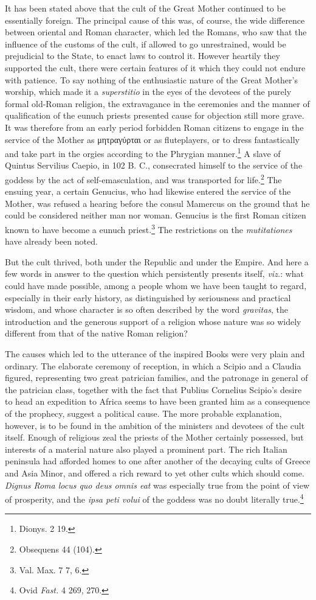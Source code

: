 \documentclass[a4paper, 11pt, oneside, polutonikogreek, english]{article}
\begin{document}
It has been stated above that the cult of the Great Mother continued to be essentially foreign. The principal cause of this was, of course, the wide difference between oriental and Roman character, which led the Romans, who saw that the influence of the customs of the cult, if allowed to go unrestrained, would be prejudicial to the State, to enact laws to control it. However heartily they supported the cult, there were certain features of it which they could not endure with patience. To say nothing of the enthusiastic nature of the Great Mother's worship, which made it a \emph{superstitio} in the eyes of the devotees of the purely formal old-Roman religion, the extravagance in the ceremonies and the manner of qualification of the eunuch priests presented cause for objection still more grave. It was therefore from an early period forbidden Roman citizens to engage in the service of the Mother as μητραγύρται or as fluteplayers, or to dress fantastically and take part in the orgies according to the Phrygian manner.\footnote{Dionys. 2 19.} A slave of Quintus Servilius Caepio, in 102 B. C., consecrated himself to the service of the goddess by the act of self-emasculation, and was transported for life.\footnote{Obsequens 44 (104).} The ensuing year, a certain Genucius, who had likewise entered the service of the Mother, was refused a hearing before the consul Mamercus on the ground that he could be considered neither man nor woman. Genucius is the first Roman citizen known to have become a eunuch priest.\footnote{Val. Max. 7 7, 6.} The restrictions on the \emph{mutitationes} have already been noted.

But the cult thrived, both under the Republic and under the Empire. And here a few words in answer to the question which persistently presents itself, \emph{viz.}: what could have made possible, among a people whom we have been taught to regard, especially in their early history, as distinguished by seriousness and practical wisdom, and whose character is so often described by the word \emph{gravitas}, the introduction and the generous support of a religion whose nature was so widely different from that of the native Roman religion?

The causes which led to the utterance of the inspired Books were very plain and ordinary. The elaborate ceremony of reception, in which a Scipio and a Claudia figured, representing two great patrician families, and the patronage in general of the patrician class, together with the fact that Publius Cornelius Scipio's desire to head an expedition to Africa seems to have been granted him as a consequence of the prophecy, suggest a political cause. The more probable explanation, however, is to be found in the ambition of the ministers and devotees of the cult itself. Enough of religious zeal the priests of the Mother certainly possessed, but interests of a material nature also played a prominent part. The rich Italian peninsula had afforded homes to one after another of the decaying cults of Greece and Asia Minor, and offered a rich reward to yet other cults which should come. \emph{Dignus Roma locus quo deus omnis eat} was especially true from the point of view of prosperity, and the \emph{ipsa peti volui} of the goddess was no doubt literally true.\footnote{Ovid \emph{Fast.} 4 269, 270.}
\end{document}

